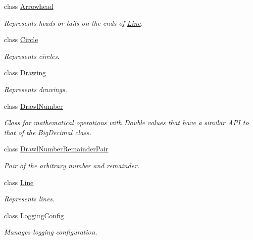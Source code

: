 \begin{DoxyCompactItemize}
\item 
class \hyperlink{classcom_1_1aarrelaakso_1_1drawl_1_1_arrowhead}{Arrowhead}
\begin{DoxyCompactList}\small\item\em Represents heads or tails on the ends of \hyperlink{classcom_1_1aarrelaakso_1_1drawl_1_1_line}{Line}. \end{DoxyCompactList}\item 
class \hyperlink{classcom_1_1aarrelaakso_1_1drawl_1_1_circle}{Circle}
\begin{DoxyCompactList}\small\item\em Represents circles. \end{DoxyCompactList}\item 
class \hyperlink{classcom_1_1aarrelaakso_1_1drawl_1_1_drawing}{Drawing}
\begin{DoxyCompactList}\small\item\em Represents drawings. \end{DoxyCompactList}\item 
class \hyperlink{classcom_1_1aarrelaakso_1_1drawl_1_1_drawl_number}{Drawl\+Number}
\begin{DoxyCompactList}\small\item\em Class for mathematical operations with Double values that have a similar A\+PI to that of the Big\+Decimal class. \end{DoxyCompactList}\item 
class \hyperlink{classcom_1_1aarrelaakso_1_1drawl_1_1_drawl_number_remainder_pair}{Drawl\+Number\+Remainder\+Pair}
\begin{DoxyCompactList}\small\item\em Pair of the arbitrary number and remainder. \end{DoxyCompactList}\item 
class \hyperlink{classcom_1_1aarrelaakso_1_1drawl_1_1_line}{Line}
\begin{DoxyCompactList}\small\item\em Represents lines. \end{DoxyCompactList}\item 
class \hyperlink{classcom_1_1aarrelaakso_1_1drawl_1_1_logging_config}{Logging\+Config}
\begin{DoxyCompactList}\small\item\em Manages logging configuration. \end{DoxyCompactList}\item 

\end{DoxyCompactItemize}
